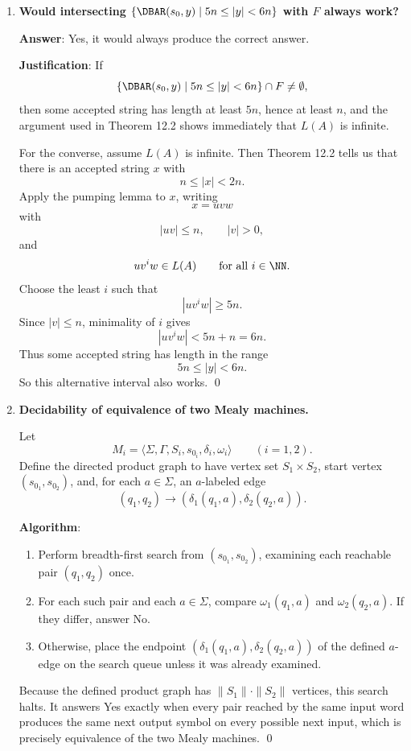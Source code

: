 \begin{enumerate}[{12.}1. ]
\item \textbf{Would intersecting $\{\DBAR(s_0,y)\mid 5n\leq|y|<6n\}$ with $F$ always work?}

\textbf{Answer}: Yes, it would always produce the correct answer.

\textbf{Justification}: If
\[
\{\DBAR(s_0,y)\mid 5n\leq|y|<6n\}\cap F\neq\emptyset,
\]
then some accepted string has length at least $5n$, hence at least $n$, and the
argument used in Theorem 12.2 shows immediately that $L(A)$ is infinite.

For the converse, assume $L(A)$ is infinite. Then Theorem 12.2 tells us that
there is an accepted string $x$ with
\[
n\leq |x|<2n.
\]
Apply the pumping lemma to $x$, writing
\[
x=uvw
\]
with
\[
|uv|\leq n,\qquad |v|>0,
\]
and
\[
uv^iw\in L(A)\qquad\text{for all }i\in\NN.
\]
Choose the least $i$ such that
\[
|uv^iw|\geq 5n.
\]
Since $|v|\leq n$, minimality of $i$ gives
\[
|uv^iw|<5n+n=6n.
\]
Thus some accepted string has length in the range
\[
5n\leq |y|<6n.
\]
So this alternative interval also works. \qed

\item \textbf{Decidability of equivalence of two Mealy machines.}

Let
\[
M_i=\langle\Sigma,\Gamma,S_i,s_{0_i},\delta_i,\omega_i\rangle
\qquad(i=1,2).
\]
Define the directed product graph to have vertex set $S_1\times S_2$, start
vertex $(s_{0_1},s_{0_2})$, and, for each $a\in\Sigma$, an $a$-labeled edge
\[
(q_1,q_2)\longrightarrow
(\delta_1(q_1,a),\delta_2(q_2,a)).
\]

\textbf{Algorithm}:
\begin{enumerate}
\item Perform breadth-first search from $(s_{0_1},s_{0_2})$, examining each
reachable pair $(q_1,q_2)$ once.
\item For each such pair and each $a\in\Sigma$, compare $\omega_1(q_1,a)$ and
$\omega_2(q_2,a)$. If they differ, answer No.
\item Otherwise, place the endpoint
$(\delta_1(q_1,a),\delta_2(q_2,a))$ of the defined $a$-edge on the search queue
unless it was already examined.
\end{enumerate}
Because the defined product graph has $\|S_1\|\cdot\|S_2\|$ vertices, this
search halts. It answers Yes exactly when every pair reached by the same input
word produces the same next output symbol on every possible next input, which
is precisely equivalence of the two Mealy machines. \qed


\end{enumerate}
